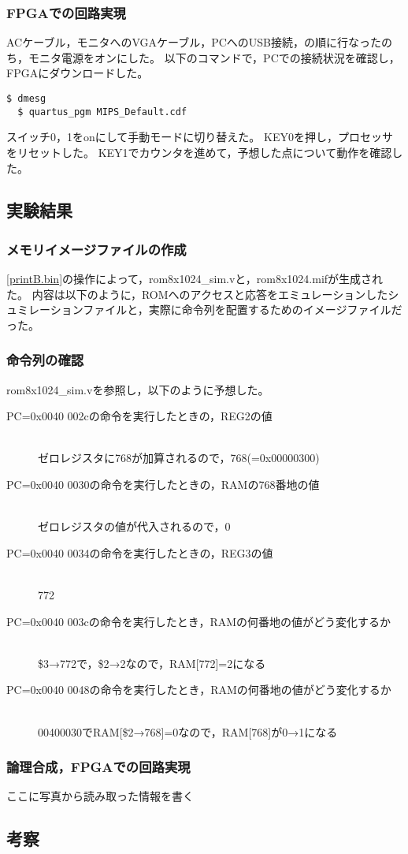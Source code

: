 \subsubsection{FPGAでの回路実現}
ACケーブル，モニタへのVGAケーブル，PCへのUSB接続，の順に行なったのち，モニタ電源をオンにした。
以下のコマンドで，PCでの接続状況を確認し，FPGAにダウンロードした。
\begin{lstlisting}[caption={FPGAでの回路実現},label={FPGAでの回路実現1-1}]
  $ dmesg
  $ quartus_pgm MIPS_Default.cdf
\end{lstlisting}

スイッチ0，1をonにして手動モードに切り替えた。
KEY0を押し，プロセッサをリセットした。
KEY1でカウンタを進めて，予想した点について動作を確認した。

\subsection{実験結果}
\subsubsection{メモリイメージファイルの作成}
\ref{printB.bin}の操作によって，rom8x1024\_sim.vと，rom8x1024.mifが生成された。
内容は以下のように，ROMへのアクセスと応答をエミュレーションしたシュミレーションファイルと，実際に命令列を配置するためのイメージファイルだった。

\subsubsection{命令列の確認}
rom8x1024\_sim.vを参照し，以下のように予想した。

\begin{description}
  \item [PC=0x0040 002cの命令を実行したときの，REG2の値]\mbox{}\\
    ゼロレジスタに768が加算されるので，768(=0x00000300)
  \item [PC=0x0040 0030の命令を実行したときの，RAMの768番地の値]\mbox{}\\
  ゼロレジスタの値が代入されるので，0
  \item [PC=0x0040 0034の命令を実行したときの，REG3の値]\mbox{}\\
    772
  \item [PC=0x0040 003cの命令を実行したとき，RAMの何番地の値がどう変化するか]\mbox{}\\
    \$3→772で，\$2→2なので，RAM[772]=2になる
  \item [PC=0x0040 0048の命令を実行したとき，RAMの何番地の値がどう変化するか]\mbox{}\\
    00400030でRAM[\$2→768]=0なので，RAM[768]が0→1になる
\end{description}

\subsubsection{論理合成，FPGAでの回路実現}
ここに写真から読み取った情報を書く

\subsection{考察}
